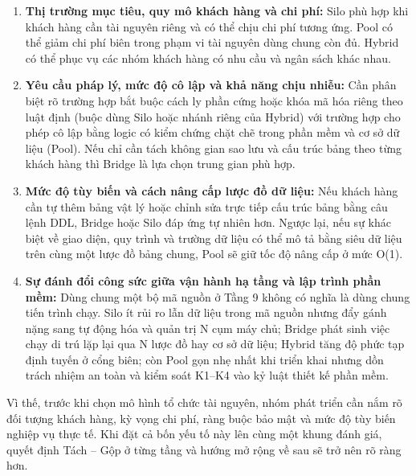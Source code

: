 \begin{enumerate}
\def\labelenumi{\arabic{enumi}.}
\item
  \textbf{Thị trường mục tiêu, quy mô khách hàng và chi phí:} Silo phù hợp khi khách hàng cần tài nguyên riêng và có thể chịu chi phí tương ứng. Pool có thể giảm chi phí biên trong phạm vi tài nguyên dùng chung còn đủ. Hybrid có thể phục vụ các nhóm khách hàng có nhu cầu và ngân sách khác nhau.
\item
  \textbf{Yêu cầu pháp lý, mức độ cô lập và khả năng chịu nhiễu:} Cần phân biệt rõ trường hợp bắt buộc cách ly phần cứng hoặc khóa mã hóa riêng theo luật định (buộc dùng Silo hoặc nhánh riêng của Hybrid) với trường hợp cho phép cô lập bằng logic có kiểm chứng chặt chẽ trong phần mềm và cơ sở dữ liệu (Pool). Nếu chỉ cần tách không gian sao lưu và cấu trúc bảng theo từng khách hàng thì Bridge là lựa chọn trung gian phù hợp.
\item
  \textbf{Mức độ tùy biến và cách nâng cấp lược đồ dữ liệu:} Nếu khách hàng cần tự thêm bảng vật lý hoặc chỉnh sửa trực tiếp cấu trúc bảng bằng câu lệnh DDL, Bridge hoặc Silo đáp ứng tự nhiên hơn. Ngược lại, nếu sự khác biệt về giao diện, quy trình và trường dữ liệu có thể mô tả bằng siêu dữ liệu trên cùng một lược đồ bảng chung, Pool sẽ giữ tốc độ nâng cấp ở mức O(1).
\item
  \textbf{Sự đánh đổi công sức giữa vận hành hạ tầng và lập trình phần mềm:} Dùng chung một bộ mã nguồn ở Tầng 9 không có nghĩa là dùng chung tiến trình chạy. Silo ít rủi ro lẫn dữ liệu trong mã nguồn nhưng đẩy gánh nặng sang tự động hóa và quản trị N cụm máy chủ; Bridge phát sinh việc chạy di trú lặp lại qua N lược đồ hay cơ sở dữ liệu; Hybrid tăng độ phức tạp định tuyến ở cổng biên; còn Pool gọn nhẹ nhất khi triển khai nhưng dồn trách nhiệm an toàn và kiểm soát K1--K4 vào kỷ luật thiết kế phần mềm.
\end{enumerate}

\begin{landscape}
\renewcommand{\VfourImageMaxHeight}{.72\textheight}
Vì thế, trước khi chọn mô hình tổ chức tài nguyên, nhóm phát triển cần nắm rõ đối tượng khách hàng, kỳ vọng chi phí, ràng buộc bảo mật và mức độ tùy biến nghiệp vụ thực tế. Khi đặt cả bốn yếu tố này lên cùng một khung đánh giá, quyết định Tách -- Gộp ở từng tầng và hướng mở rộng về sau sẽ trở nên rõ ràng hơn.
\end{landscape}


